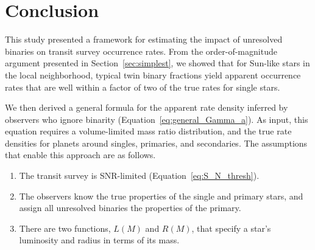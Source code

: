 \documentclass[12pt,modern]{aastex61}
\begin{document}

\section{Conclusion}
\label{sec:conclusion}

This study presented a framework for estimating the impact of
unresolved binaries on transit survey occurrence rates. From
the order-of-magnitude argument presented in
Section~\ref{sec:simplest}, we showed that for Sun-like stars in the
local neighborhood, typical twin binary fractions yield apparent
occurrence rates that are well within a factor of two of the true
rates for single stars.

We then derived a general formula for the apparent rate density
inferred by observers who ignore binarity
(Equation~\ref{eq:general_Gamma_a}).  As input, this equation requires
a volume-limited mass ratio distribution, and the true rate densities
for planets around singles, primaries, and secondaries.  The
assumptions that enable this approach are as follows.
\begin{enumerate}
    \item The transit survey is SNR-limited
        (Equation~\ref{eq:S_N_thresh}).
    \item The observers know the true properties of the single
        and primary stars, and assign all unresolved binaries the
        properties of the primary.
    \item There are two functions, $L(M)$ and $R(M)$, that specify a
        star's luminosity and radius in terms of its mass.
\end{enumerate}
\end{document}
